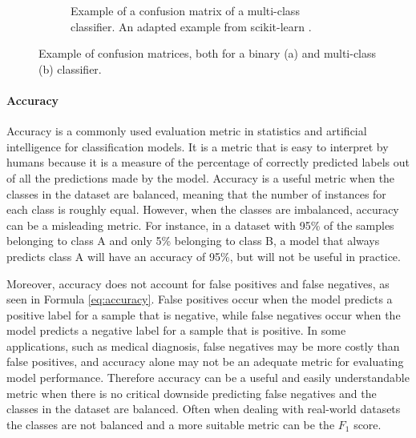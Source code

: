 \begin{figure}[htb]
{\begin{subfigure}[b]{0.5\textwidth}
                 \caption{Example of a confusion matrix of a multi-class classifier. An adapted example from scikit-learn \cite{ConfusionMatrix}.}
                 \label{fig:confusion_multi}
             \end{subfigure}
             }
            \caption{Example of confusion matrices, both for a binary (a) and multi-class (b) classifier.}
            \label{fig:confusion_matrices}
        \end{figure}


        \paragraph{Accuracy\\}

        Accuracy is a commonly used evaluation metric in statistics and artificial intelligence for classification models. It is a metric that is easy to interpret by humans because it is a measure of the percentage of correctly predicted labels out of all the predictions made by the model. Accuracy is a useful metric when the classes in the dataset are balanced, meaning that the number of instances for each class is roughly equal. However, when the classes are imbalanced, accuracy can be a misleading metric. For instance, in a dataset with 95\% of the samples belonging to class A and only 5\% belonging to class B, a model that always predicts class A will have an accuracy of 95\%, but will not be useful in practice.

        Moreover, accuracy does not account for false positives and false negatives, as seen in Formula \ref{eq:accuracy}. False positives occur when the model predicts a positive label for a sample that is negative, while false negatives occur when the model predicts a negative label for a sample that is positive. In some applications, such as medical diagnosis, false negatives may be more costly than false positives, and accuracy alone may not be an adequate metric for evaluating model performance. Therefore accuracy can be a useful and easily understandable metric when there is no critical downside predicting false negatives and the classes in the dataset are balanced. Often when dealing with real-world datasets the classes are not balanced and a more suitable metric can be the $F_1$ score.
        


